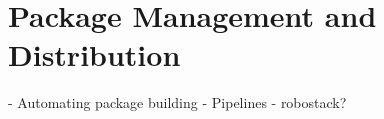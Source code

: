 \chapter{Package Management and Distribution}\label{cha:packages}

- Automating package building
- Pipelines
- robostack?